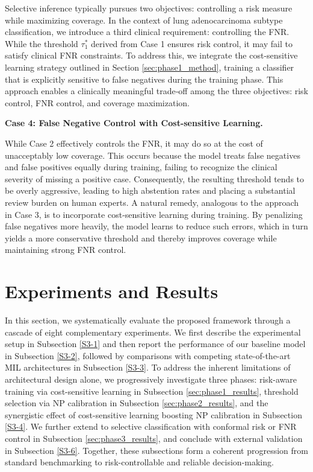 \documentclass[journal,twoside,web]{ieeecolor}
\begin{document}
Selective inference typically pursues two objectives: controlling a risk measure while maximizing coverage. In the context of lung adenocarcinoma subtype classification, we introduce a third clinical requirement: controlling the FNR. While the threshold \(\tau_{1}^{*}\) derived from Case 1 ensures risk control, it may fail to satisfy clinical FNR constraints. To address this, we integrate the cost-sensitive learning strategy outlined in Section \ref{sec:phase1_method}, training a classifier that is explicitly sensitive to false negatives during the training phase. This approach enables a clinically meaningful trade‑off among the three objectives: risk control, FNR control, and coverage maximization.

\textbf{Case 4: False Negative Control with Cost-sensitive Learning.}

While Case 2 effectively controls the FNR, it may do so at the cost of unacceptably low coverage. This occurs because the model treats false negatives and false positives equally during training, failing to recognize the clinical severity of missing a positive case. Consequently, the resulting threshold tends to be overly aggressive, leading to high abstention rates and placing a substantial review burden on human experts. A natural remedy, analogous to the approach in Case 3, is to incorporate cost‑sensitive learning during training. By penalizing false negatives more heavily, the model learns to reduce such errors, which in turn yields a more conservative threshold and thereby improves coverage while maintaining strong FNR control.

\section{Experiments and Results}\label{sec:experiments}

In this section, we systematically evaluate the proposed framework through a cascade of eight complementary experiments. We first describe the experimental setup in Subsection \ref{S3-1} and then report the performance of our baseline model in Subsection \ref{S3-2}, followed by comparisons with competing state-of-the-art MIL architectures in Subsection \ref{S3-3}. To address the inherent limitations of architectural design alone, we progressively investigate three phases: risk-aware training via cost-sensitive learning in Subsection \ref{sec:phase1_results}, threshold selection via NP calibration in Subsection \ref{sec:phase2_results}, and the synergistic effect of cost-sensitive learning boosting NP calibration in Subsection \ref{S3-4}. We further extend to selective classification with conformal risk or FNR control in Subsection \ref{sec:phase3_results}, and conclude with external validation in Subsection \ref{S3-6}. Together, these subsections form a coherent progression from standard benchmarking to risk-controllable and reliable decision-making.
\end{document}
